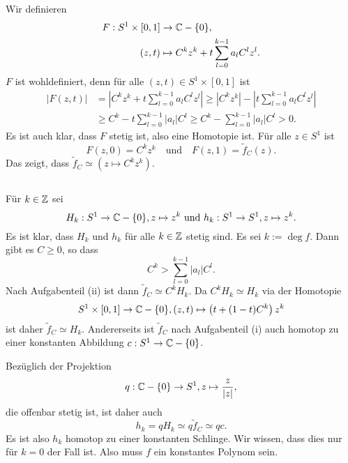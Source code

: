\documentclass[a4paper,10pt]{article}
\begin{document}
\subsection{}
Wir definieren
\begin{align*}
 F : S^1 \times [0,1] &\to \mathbb{C} - \{0\}, \\
 (z,t) &\mapsto C^k z^k + t \sum_{l=0}^{k-1} a_l C^l z^l.
\end{align*}
$F$ ist wohldefiniert, denn für alle $(z,t) \in S^1 \times [0,1]$ ist
\begin{align*}
 |F(z,t)|
 &=  \left| C^k z^k + t \sum_{l=0}^{k-1} a_l C^l z^l \right|
 \geq \left| C^k z^k \right| - \left| t \sum_{l=0}^{k-1} a_l C^l z^l \right| \\
 &\geq C^k - t \sum_{l=0}^{k-1} |a_l| C^l
 \geq C^k - \sum_{l=0}^{k-1} |a_l| C^l
 > 0.
\end{align*}
Es ist auch klar, dass $F$ stetig ist, also eine Homotopie ist. Für alle $z \in S^1$ ist
\[
 F(z,0) = C^k z^k \quad \text{und} \quad F(z,1) = \tilde{f}_C(z).
\]
Das zeigt, dass $\tilde{f}_C \simeq \left(z \mapsto C^k z^k\right)$.


\subsection{}
Für $k \in \mathbb{Z}$ sei
\[
 H_k : S^1 \to \mathbb{C} - \{0\}, z \mapsto z^k \text{ und }
 h_k : S^1 \to S^1, z \mapsto z^k.
\]
Es ist klar, dass $H_k$ und $h_k$ für alle $k \in \mathbb{Z}$ stetig sind. Es sei $k := \deg f$.
Dann gibt es $C \geq 0$, so dass
\[
 C^k > \sum_{l=0}^{k-1} |a_l| C^l.
\]
Nach Aufgabenteil (ii) ist dann $\tilde{f}_C \simeq C^k H_k$. Da $C^k H_k \simeq H_k$ via der Homotopie
\[
 S^1 \times [0,1] \to \mathbb{C} - \{0\}, (z,t) \mapsto  \left(t + (1-t)C^k\right) z^k
\]
ist daher $\tilde{f}_C \simeq H_k$. Andererseits ist $\tilde{f}_C$ nach Aufgabenteil (i) auch homotop zu einer konstanten Abbildung $c : S^1 \to \mathbb{C} - \{0\}$.

Bezüglich der Projektion
\[
 q : \mathbb{C} - \{0\} \to S^1, z \mapsto \frac{z}{|z|},
\]
die offenbar stetig ist, ist daher auch
\[
 h_k = q H_k \simeq q \tilde{f}_C \simeq q c.
\]
Es ist also $h_k$ homotop zu einer konstanten Schlinge. Wir wissen, dass dies nur für $k = 0$ der Fall ist. Also muss $f$ ein konstantes Polynom sein.
\end{document}
